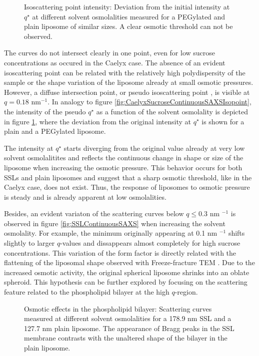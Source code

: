 \begin{figure}
	\centering
		
		\caption{Isoscattering point intensity: Deviation from the initial intensity at $q^{\star}$ at different solvent osmolalities measured for a PEGylated and plain liposome of similar sizes. A clear osmotic threshold can not be observed.}
		\label{fig:SSLIsopointIntensity}
\end{figure}

The curves do not intersect clearly in one point, even for low sucrose concentrations as occured in the Caelyx case. The absence of an evident isoscattering point can be related with the relatively high polydispersity of the sample or the shape variation of the liposome already at small osmotic pressures. However, a diffuse intersection point, or pseudo isoscattering point \cite{kawaguchi_application_2004}, is visible at $q=0.18$ nm$^{-1}$. In analogy to figure \ref{fig:CaelyxSucroseContinuousSAXSIsopoint}, the intensity of the pseudo $q^{\star}$ as a function of the solvent osmolality is depicted in figure \ref{fig:SSLIsopointIntensity}, where the deviation from the original intensity at $q^{\star}$ is shown for a plain and a PEGylated liposome.

The intensity at $q^{\star}$ starts diverging from the original value already at very low solvent osmolalitites and reflects the continuous change in shape or size of the liposome when increasing the osmotic pressure. This behavior occurs for both SSLs and plain liposomes and suggest that a sharp osmotic threshold, like in the Caelyx case, does not exist. Thus, the response of liposomes to osmotic pressure is steady and is already apparent at low osmolalities.

Besides, an evident variaton of the scattering curves below $q\leq0.3$ nm $^{-1}$ is observed in figure \ref{fig:SSLContinuousSAXS} when increasing the solvent osmolality. For example, the minimum originally appearing at 0.1 nm $^{-1}$ shifts slightly to larger $q$-values and dissappears almost completely for high sucrose concentrations. This variation of the form factor is directly related with the flattening of the liposomal shape observed with Freeze-fracture TEM \cite{varga_osmotic_2014}. Due to the increased osmotic activity, the original spherical liposome shrinks into an oblate spheroid. This hypothesis can be further explored by focusing on the scattering feature related to the phospholipid bilayer at the high $q$-region.

\begin{figure}
	\centering
		\subfloat[PEG 178.9 nm]{\resizebox{0.44\linewidth}{!}{}\label{fig:SSLContrastCurvesBilayer200SSL}}
		\subfloat[Plain 127.7 nm]{\resizebox{0.44\linewidth}{!}{}\label{fig:SSLContrastCurvesBilayer100Plain}}
		\caption{Osmotic effects in the phospholipid bilayer: Scattering curves measured at different solvent osmolalities for a 178.9 nm SSL and a 127.7 nm plain liposome. The appearance of Bragg peaks in the SSL membrane contrasts with the unaltered shape of the bilayer in the plain liposome.}
\end{figure}

